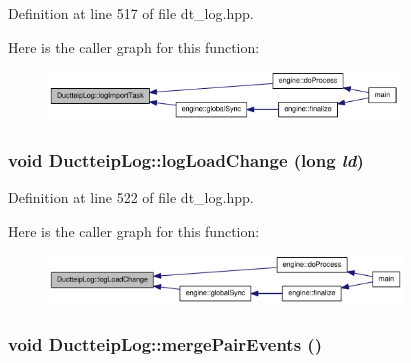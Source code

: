 Definition at line 517 of file dt\_\-log.hpp.

Here is the caller graph for this function:\nopagebreak
\begin{figure}[H]
\begin{center}
\leavevmode
\includegraphics[width=263pt]{class_ductteip_log_adcec387e3a205d72e92baba0ea3019c1_icgraph}
\end{center}
\end{figure}
\hypertarget{class_ductteip_log_acd0bf80ce85006d33a78318bd79a060a}{
\subsubsection[{logLoadChange}]{\setlength{\rightskip}{0pt plus 5cm}void DuctteipLog::logLoadChange (long {\em ld})}}
\label{class_ductteip_log_acd0bf80ce85006d33a78318bd79a060a}


Definition at line 522 of file dt\_\-log.hpp.

Here is the caller graph for this function:\nopagebreak
\begin{figure}[H]
\begin{center}
\leavevmode
\includegraphics[width=266pt]{class_ductteip_log_acd0bf80ce85006d33a78318bd79a060a_icgraph}
\end{center}
\end{figure}
\hypertarget{class_ductteip_log_a3062026052a3d861e37f7703808b4e29}{
\subsubsection[{mergePairEvents}]{\setlength{\rightskip}{0pt plus 5cm}void DuctteipLog::mergePairEvents ()}}
\label{class_ductteip_log_a3062026052a3d861e37f7703808b4e29}


